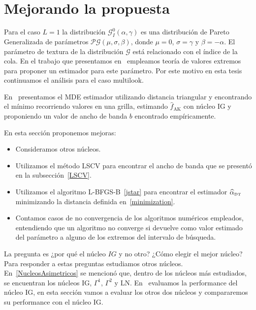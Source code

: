 \section{Mejorando la propuesta}
\label{mejorando}

Para el caso $L=1$ la distribución $\mathcal{G}_I^0(\alpha,\gamma)$ es una distribución de Pareto Generalizada de parámetros $\mathcal{PG}(\mu,\sigma,\beta)$, donde $\mu=0$, $\sigma=\gamma$ y $\beta=-\alpha$. El parámetro de textura de la distribución $\mathcal{G}$ está relacionado con el índice de la cola. En el trabajo que presentamos en~\cite{Chan2016} empleamos teoría de valores extremos para proponer un estimador para este parámetro. Por este motivo en esta tesis continuamos el análisis para el caso multilook.

En~\cite{gambini2015} presentamos el MDE estimador utilizando distancia triangular y encontrando el mínimo recorriendo valores en una grilla, estimando $\widehat{f}_{\text{AK}}$ con núcleo IG y proponiendo un valor de ancho de banda $b$ encontrado empíricamente.

En esta sección proponemos mejoras:

\begin{itemize}
	\item Consideramos otros núcleos.%
	\item Utilizamos el método LSCV para encontrar el ancho de banda que se presentó en la subsección~\ref{LSCV}.
	\item Utilizamos el algoritmo L-BFGS-B~\ref{jstar} para encontrar el estimador $\widehat{\alpha}_{\text{\tiny{DT}}}$ minimizando la distancia definida en~\ref{minimization}.
	\item Contamos casos de no convergencia de los algoritmos numéricos empleados, entendiendo que un algoritmo no converge si devuelve como valor estimado del parámetro a alguno de los extremos del intervalo de búsqueda.
\end{itemize}  

La pregunta es ¿por qué el núcleo $IG$ y no otro? ¿Cómo elegir el mejor núcleo? Para responder a estas preguntas estudiamos otros núcleos. En~\ref{NucleosAsimetricos} se mencionó que, dentro de los núcleos más estudiados, se encuentran los núcleos IG, $\Gamma^1$, $\Gamma^2$ y LN. En~\cite{gambini2015} evaluamos la performance del núcleo IG, en esta sección vamos a evaluar los otros dos núcleos y compararemos su performance con el núcleo IG. 

